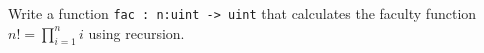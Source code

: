 Write a function \lstinline{fac : n:uint -> uint} that calculates the faculty function $n! = \prod_{i=1}^ni$ using recursion.
